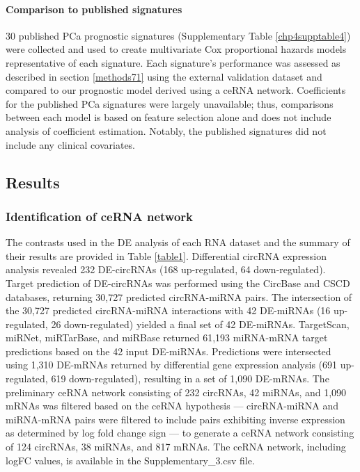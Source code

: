 \paragraph{Comparison to published signatures}\label{methods9}
30 published PCa prognostic signatures (Supplementary Table \ref{chp4supptable4}) were collected and used to create multivariate Cox proportional hazards models representative of each signature. Each signature's performance was assessed as described in section \ref{methods71} using the external validation dataset and compared to our prognostic model derived using a ceRNA network. Coefficients for the published PCa signatures were largely unavailable; thus, comparisons between each model is based on feature selection alone and does not include analysis of coefficient estimation. Notably, the published signatures did not include any clinical covariates.


\subsection{Results}
\subsubsection{Identification of ceRNA network}\label{results1}
The contrasts used in the DE analysis of each RNA dataset and the summary of their results are provided in Table \ref{table1}. Differential circRNA expression analysis revealed 232 DE-circRNAs (168 up-regulated, 64 down-regulated). Target prediction of DE-circRNAs was performed using the CircBase and CSCD databases, returning 30,727 predicted circRNA-miRNA pairs. The intersection of the 30,727 predicted circRNA-miRNA interactions with 42 DE-miRNAs (16 up-regulated, 26 down-regulated) yielded a final set of 42 DE-miRNAs. TargetScan, miRNet, miRTarBase, and miRBase returned 61,193 miRNA-mRNA target predictions based on the 42 input DE-miRNAs. Predictions were intersected using 1,310 DE-mRNAs returned by differential gene expression analysis (691 up-regulated, 619 down-regulated), resulting in a set of 1,090 DE-mRNAs. The preliminary ceRNA network consisting of 232 circRNAs, 42 miRNAs, and 1,090 mRNAs was filtered based on the ceRNA hypothesis --- circRNA-miRNA and miRNA-mRNA pairs were filtered to include pairs exhibiting inverse expression as determined by log fold change sign --- to generate a ceRNA network consisting of 124 circRNAs, 38 miRNAs, and 817 mRNAs. The ceRNA network, including logFC values, is available in the Supplementary\_3.csv file.


